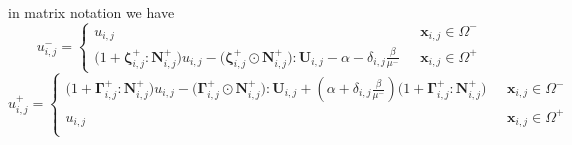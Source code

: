 \documentclass{elsarticle}
\begin{document}
in matrix notation we have
\begin{equation}
	u_{i,j}^-=\begin{cases}
		u_{i,j}                                                                                                                                                                                                 & \text{ $\mathbf{x}_{i,j}\in \Omega^-$} \\
		\big(1 + \boldsymbol{\zeta}^+_{i,j} : \mathbf{N}^+_{i,j}\big) u_{i,j}  -  \big( \boldsymbol{\zeta}^+_{i,j} \odot \mathbf{N}^+_{i,j} \big) : \mathbf{U}_{i,j} - \alpha - \delta_{i,j}\frac{\beta}{\mu^-} & \text{ $\mathbf{x}_{i,j}\in \Omega^+$}
	\end{cases}
\end{equation}
\begin{equation}
	u_{i,j}^+=\begin{cases}
		\big(1 + \boldsymbol{\Gamma}^+_{i,j} : \mathbf{N}^+_{i,j}\big) u_{i,j} - \big( \boldsymbol{ \Gamma}^+_{i,j} \odot  \mathbf{N}^+_{i,j}  \big) : \mathbf{U}_{i,j} + (\alpha + \delta_{i,j}\frac{\beta}{\mu^-})\big(1 + \boldsymbol{\Gamma}^+_{i,j} : \mathbf{N}^+_{i,j} \big) & \text{ $\mathbf{x}_{i,j}\in \Omega^-$} \\
		u_{i,j}                                                                                                                                                                                                                                                                     & \text{ $\mathbf{x}_{i,j}\in \Omega^+$} \\
	\end{cases}
\end{equation}
\end{document}
